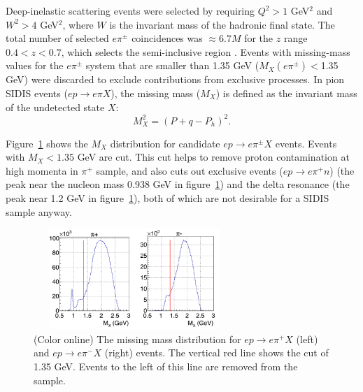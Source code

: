 \documentclass[aps,prl,twocolumn,showpacs,superscriptaddress,groupedaddress]{revtex4-1}  %
\begin{document}
Deep-inelastic scattering events were selected by requiring $Q^2>1$ GeV$^2$ and  $W^2>4$ GeV$^2$,
where $W$ is the invariant mass of the hadronic final state. 
The total number of selected $e\pi^\pm$ coincidences was $\approx 6.7M$ for the $z$ range $0.4<z<0.7$, which selects the semi-inclusive region \cite{Avakian:2010ae}.
Events with missing-mass values for the $e\pi^\pm$ system that are smaller 
than 1.35 GeV ($M_{X}(e\pi^\pm)<$1.35 GeV) were discarded to exclude contributions from exclusive processes. 
In pion SIDIS events ($ep \rightarrow e\pi X$), the missing mass ($M_X$) is defined as the invariant mass of the undetected state $X$:
\begin{equation}
\label{eq:missingMassDefinition}
M_X^2 = \left( P + q - P_h \right)^2.
\end{equation}

Figure~\ref{fig:pipMissingMassCut} shows the $M_X$ distribution for candidate $ep \rightarrow e\pi^\pm X$ events.
Events with $M_X < 1.35$ GeV are cut.
This cut helps to remove proton contamination at high momenta in $\pi^+$ sample, and also cuts out exclusive events ($ep \rightarrow e\pi^+ n$) (the peak near the nucleon mass 0.938 GeV in figure~\ref{fig:pipMissingMassCut}) and the delta resonance (the peak near 1.2 GeV in figure~\ref{fig:pipMissingMassCut}), both of which are not desirable for a SIDIS sample anyway.
\begin{figure}[htp]
\centering
\includegraphics[width=3.0in,height=1.5in]{plots/missingMassCut.png}
\caption{(Color online) The missing mass distribution for $ep \rightarrow e\pi^+ X$ (left) and  $ep \rightarrow e\pi^- X$ (right) events. 
The vertical red line shows the cut of 1.35 GeV. Events to the left of this line are removed from the sample.}
\label{fig:pipMissingMassCut}
\end{figure}
%
\end{document}
